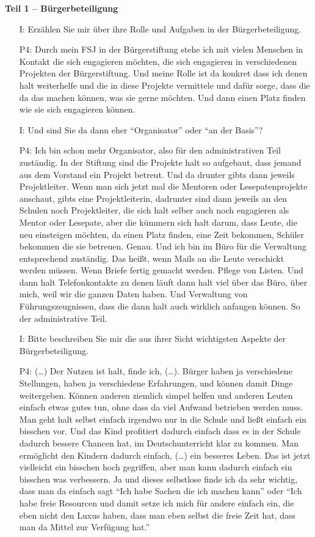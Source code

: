 \textbf{Teil 1 -- B{\"u}rgerbeteiligung}
\begin{itemize}
    \item[I:] Erz{\"a}hlen Sie mir {\"u}ber ihre Rolle und Aufgaben in der B{\"u}rgerbeteiligung.
    \item[P4:] Durch mein FSJ in der B{\"u}rgerstiftung stehe ich mit vielen Menschen in Kontakt die sich engagieren m{\"o}chten, die sich engagieren in verschiedenen Projekten der B{\"u}rgerstiftung. Und meine Rolle ist da konkret dass ich denen halt weiterhelfe und die in diese Projekte vermittele und daf{\"u}r sorge, dass die da das machen k{\"o}nnen, was sie gerne m{\"o}chten. Und dann einen Platz finden wie sie sich engagieren k{\"o}nnen.
    \item[I:] Und sind Sie da dann eher "`Organisator"' oder "`an der Basis"'?
    \item[P4:] Ich bin schon mehr Organisator, also f{\"u}r den administrativen Teil zust{\"a}ndig. In der Stiftung sind die Projekte halt so aufgebaut, dass jemand aus dem Vorstand ein Projekt betreut. Und da drunter gibts dann jeweils Projektleiter. Wenn man sich jetzt mal die Mentoren oder Lesepatenprojekte anschaut, gibts eine Projektleiterin, dadrunter sind dann jeweils an den Schulen noch Projektleiter, die sich halt selber auch noch engagieren als Mentor oder Lesepate, aber die k{\"u}mmern sich halt darum, dass Leute, die neu einsteigen m{\"o}chten, da einen Platz finden, eine Zeit bekommen, Sch{\"u}ler bekommen die sie betreuen. Genau. Und ich bin im B{\"u}ro f{\"u}r die Verwaltung entsprechend zust{\"a}ndig. Das hei{\ss}t, wenn Mails an die Leute verschickt werden m{\"u}ssen. Wenn Briefe fertig gemacht werden. Pflege von Listen. Und dann halt Telefonkontakte zu denen l{\"a}uft dann halt viel {\"u}ber das B{\"u}ro, {\"u}ber mich, weil wir die ganzen Daten haben. Und Verwaltung von F{\"u}hrungszeugnissen, dass die dann halt auch wirklich anfangen k{\"o}nnen. So der administrative Teil.
    \item[I:] Bitte beschreiben Sie mir die aus ihrer Sicht wichtigsten Aspekte der B{\"u}rgerbeteiligung.
    \item[P4:] (\dots) Der Nutzen ist halt, finde ich, (\dots). B{\"u}rger haben ja verschiedene Stellungen, haben ja verschiedene Erfahrungen, und k{\"o}nnen damit Dinge weitergeben. K{\"o}nnen anderen ziemlich simpel helfen und anderen Leuten einfach etwas gutes tun, ohne dass da viel Aufwand betrieben werden muss. Man geht halt selbst einfach irgendwo nur in die Schule und lie{\ss}t einfach ein bisschen vor. Und das Kind profitiert dadurch einfach dass es in der Schule dadurch bessere Chancen hat, im Deutschunterricht klar zu kommen. Man erm{\"o}glicht den Kindern dadurch einfach, (\dots) ein besseres Leben. Das ist jetzt vielleicht ein bisschen hoch gegriffen, aber man kann dadurch einfach ein bisschen was verbessern. Ja und dieses selbstlose finde ich da sehr wichtig, dass man da einfach sagt "`Ich habe Sachen die ich machen kann"' oder "`Ich habe freie Resourcen und damit setze ich mich f{\"u}r andere einfach ein, die eben nicht den Luxus haben, dass man eben selbst die freie Zeit hat, dass man da Mittel zur Verf{\"u}gung hat."'

\end{itemize}
